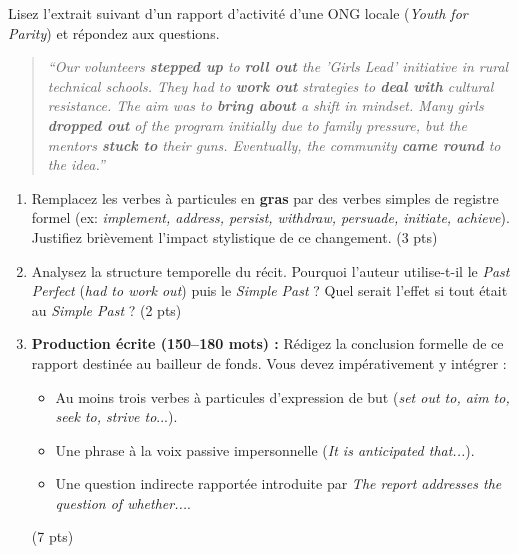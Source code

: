 \documentclass[11pt]{article}
\begin{document}
\begin{exercice}
Lisez l'extrait suivant d'un rapport d'activité d'une ONG locale (\textit{Youth for Parity}) et répondez aux questions.

\begin{quote}
\textit{``Our volunteers \textbf{stepped up} to \textbf{roll out} the 'Girls Lead' initiative in rural technical schools. They had to \textbf{work out} strategies to \textbf{deal with} cultural resistance. The aim was to \textbf{bring about} a shift in mindset. Many girls \textbf{dropped out} of the program initially due to family pressure, but the mentors \textbf{stuck to} their guns. Eventually, the community \textbf{came round} to the idea.''}
\end{quote}

\begin{enumerate}
    \item Remplacez les verbes à particules en \textbf{gras} par des verbes simples de registre formel (ex: \textit{implement, address, persist, withdraw, persuade, initiate, achieve}). Justifiez brièvement l'impact stylistique de ce changement. (3 pts)
    \item Analysez la structure temporelle du récit. Pourquoi l'auteur utilise-t-il le \textit{Past Perfect} (\textit{had to work out}) puis le \textit{Simple Past} ? Quel serait l'effet si tout était au \textit{Simple Past} ? (2 pts)
    \item \textbf{Production écrite (150--180 mots) :} Rédigez la conclusion formelle de ce rapport destinée au bailleur de fonds. Vous devez impérativement y intégrer :
    \begin{itemize}
        \item Au moins trois verbes à particules d'expression de but (\textit{set out to, aim to, seek to, strive to}...).
        \item Une phrase à la voix passive impersonnelle (\textit{It is anticipated that...}).
        \item Une question indirecte rapportée introduite par \textit{The report addresses the question of whether...}.
    \end{itemize} (7 pts)
\end{enumerate}
\end{exercice}
\end{document}
